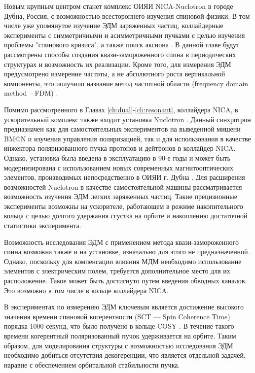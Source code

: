 \par Новым крупным центром станет комплекс ОИЯИ NICA-Nuclotron в городе Дубна, Россия, с возможностью всестороннего изучения спиновой физики. В том числе уже упомянутое изучение ЭДМ заряженных частиц, коллайдерные эксперименты с симметричными и асимметричными пучками с целью изучения проблемы "спинового кризиса"\cite{ST_Filatov}, а также поиск аксиона \cite{Axion_Nikolaev}. В данной главе будут рассмотрены способы создания квази-замороженного спина в периодических структурах и возможность их реализации. Кроме того, для измерения ЭДМ предусмотрено измерение частоты, а не абсолютного роста вертикальной компоненты, что получило название метод частотной области (frequency domain method -- FDM) \cite{FDM}.

\par Помимо рассмотренного в Главах \ref{ch:dual}-\ref{ch:resonant}, коллайдера NICA, в ускорительный комплекс также входит установка Nuclotron \cite{nuclotron24}. Данный синхротрон предназначен как для самостоятельных экспериментов на выведенной мишени BM@N и изучения управления поляризацией, так и для использования в качестве инжектора поляризованного пучка протонов и дейтронов в коллайдер NICA. Однако, установка была введена в эксплуатацию в 90-е годы \cite{baldin:nuclotron} и может быть модернизирована с использованием новых современных магнитооптических элементов, производимых непосредственно в ОИЯИ г. Дубна \cite{korovkin:nica_magnets}. Для расширения возможностей Nuclotron в качестве самостоятельной машины рассматривается возможность изучения ЭДМ легких заряженных частиц. Такие прецизионные эксперименты возможны на ускорителе, работающем в режиме накопительного кольца с целью долгого удержания сгустка на орбите и накоплению достаточной статистики эксперимента. 

\par Возможность исследования ЭДМ с применением метода квази-замороженного спина возможна также и на установке, изначально для этого не предназначенной. Однако, поскольку для компенсации влияния МДМ необходимо использование элементов с электрическим полем, требуется дополнительное место для их расположение. Такое может быть достигнуто путем введения обводных каналов. Это возможно в том числе в кольце коллайдера NICA.

\par В экспериментах по измерению ЭДМ ключевым является достижение высокого значения времени спиновой когерентности (SCT — Spin Coherence Time) порядка 1000 секунд, что было получено в кольце COSY \cite{AGSproposal}. В течение такого времени когерентный поляризованный пучок удерживается на орбите. Таким образом, для моделирования структуры с возможностью исследования ЭДМ необходимо добиться отсутствия декогеренции, что является отдельной задачей, наравне с обеспечением орбитальной стабильности пучка.

